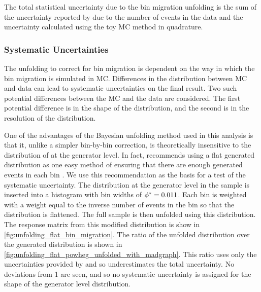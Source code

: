 The total statistical uncertainty due to the bin migration unfolding is the
sum of the uncertainty reported by \RooUnfold due to the number of events in
the data and the uncertainty calculated using the toy MC method in quadrature.

\subsubsection{Systematic Uncertainties}
\label{ssec:unfolding_systematic_uncertainties}

The unfolding to correct for bin migration is dependent on the way in which the
bin migration is simulated in MC. Differences in the \phistar distribution
between MC and data can lead to systematic uncertainties on the final result.
Two such potential differences between the MC and the data are considered. The
first potential difference is in the shape of the \phistar distribution, and
the second is in the resolution of the \phistar distribution.

One of the advantages of the Bayesian unfolding method used in this analysis is
that it, unlike a simpler bin-by-bin correction, is theoretically insensitive
to the distribution of \phistar at the generator level. In fact, \DAgostini
recommends using a flat generated distribution as one easy method of ensuring
that there are enough generated events in each bin \cite{dagostini_1995}. We
use this recommendation as the basis for a test of the systematic uncertainty.
The \phistar distribution at the generator level in the \MADGRAPH sample is
inserted into a histogram with bin widths of $\phi^{*} = 0.011$. Each bin is
weighted with a weight equal to the inverse number of events in the bin so that
the distribution is flattened. The full \POWHEG sample is then unfolded using
this \MADGRAPH distribution. The response matrix from this modified \MADGRAPH
distribution is show in \cref{fig:unfolding_flat_bin_migration}. The ratio
of the unfolded \POWHEG distribution over the generated distribution is shown
in \cref{fig:unfolding_flat_powheg_unfolded_with_madgraph}. This ratio uses
only the uncertainties provided by \RooUnfold and so underestimates the total
uncertainty. No deviations from \num{1} are seen, and so no systematic
uncertainty is assigned for the shape of the generator level \phistar
distribution.

